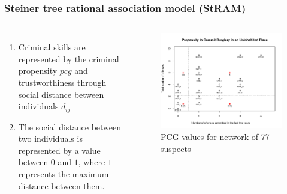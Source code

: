 \documentclass[aspectratio=169]{beamer}
\begin{document}
\begin{frame}
\frametitle{Steiner tree rational association model (StRAM)}
  \begin{columns}
    \begin{enumerate}
      \item Criminal skills are represented by the criminal propensity $pcg$ and trustworthiness through social distance between individuals $d_{ij}$
      \item The social distance between two individuals is represented by a value between $0$ and $1$, where $1$ represents the maximum distance between them.
    \end{enumerate}
    \begin{figure}[ht]
      \centering
      \includegraphics[width=\textwidth]{images/pcg_pdi.pdf}
      \caption{\footnotesize PCG values for network of 77 suspects}
    \end{figure}
  \end{columns}
\end{frame}
\end{document}
